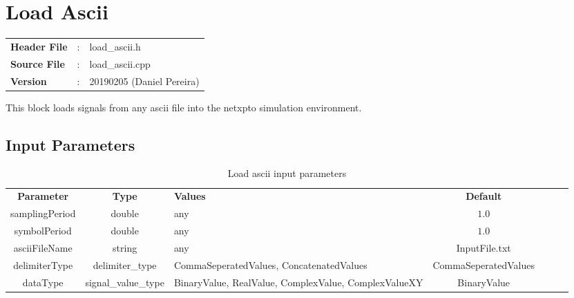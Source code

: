 \clearpage

\section{Load Ascii}

\begin{tcolorbox}	
	\begin{tabular}{p{2.75cm} p{0.2cm} p{10.5cm}} 	
		\textbf{Header File}   &:& load\_ascii.h \\
		\textbf{Source File}   &:& load\_ascii.cpp \\
        \textbf{Version}       &:& 20190205 (Daniel Pereira)\\
	\end{tabular}
\end{tcolorbox}

This block loads signals from any ascii file into the netxpto simulation environment.

\subsection*{Input Parameters}

\begin{table}[h]
	\centering
	\begin{tabular}{|c|c|p{60mm}|c|ccc}
		\cline{1-4}
		\textbf{Parameter} & \textbf{Type}   & \textbf{Values} &   \textbf{Default}& \\ \cline{1-4}
		samplingPeriod & double              & any                                                  & $1.0$                \\ \cline{1-4}
        symbolPeriod   & double              & any                                                  & $1.0$                \\ \cline{1-4}
        asciiFileName  & string              & any                                                  & InputFile.txt        \\ \cline{1-4}
        delimiterType  & delimiter\_type     & CommaSeperatedValues, ConcatenatedValues             & CommaSeperatedValues \\ \cline{1-4}
        dataType       & signal\_value\_type & BinaryValue, RealValue, ComplexValue, ComplexValueXY & BinaryValue          \\ \cline{1-4}
	\end{tabular}
	\caption{Load ascii input parameters} 
	\label{table:LoadAscii_in_par}
\end{table}

